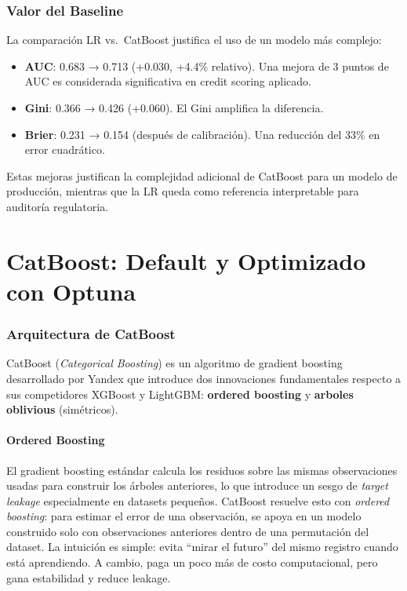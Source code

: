 \documentclass[
  spanish,
  11pt,
  letterpaper,
]{scrbook}
\providecommand{\tightlist}{%
  \setlength{\itemsep}{0pt}\setlength{\parskip}{0pt}}
\theoremstyle{plain}
\theoremstyle{remark}
\begin{document}
\subsection{Valor del Baseline}\label{valor-del-baseline}

La comparación LR vs.~CatBoost justifica el uso de un modelo más
complejo:

\begin{itemize}
\tightlist
\item
  \textbf{AUC}: 0.683 → 0.713 (+0.030, +4.4\% relativo). Una mejora de 3
  puntos de AUC es considerada significativa en credit scoring aplicado.
\item
  \textbf{Gini}: 0.366 → 0.426 (+0.060). El Gini amplifica la
  diferencia.
\item
  \textbf{Brier}: 0.231 → 0.154 (después de calibración). Una reducción
  del 33\% en error cuadrático.
\end{itemize}

Estas mejoras justifican la complejidad adicional de CatBoost para un
modelo de producción, mientras que la LR queda como referencia
interpretable para auditoría regulatoria.

\chapter{CatBoost: Default y Optimizado con
Optuna}\label{sec-catboost-tuned}

\subsection{Arquitectura de CatBoost}\label{arquitectura-de-catboost}

CatBoost (\emph{Categorical Boosting}) es un algoritmo de gradient
boosting desarrollado por Yandex que introduce dos innovaciones
fundamentales respecto a sus competidores XGBoost y LightGBM:
\textbf{ordered boosting} y \textbf{arboles oblivious} (simétricos).

\subsubsection{Ordered Boosting}\label{ordered-boosting}

El gradient boosting estándar calcula los residuos sobre las mismas
observaciones usadas para construir los árboles anteriores, lo que
introduce un sesgo de \emph{target leakage} especialmente en datasets
pequeños. CatBoost resuelve esto con \emph{ordered boosting}: para
estimar el error de una observación, se apoya en un modelo construido
solo con observaciones anteriores dentro de una permutación del dataset.
La intuición es simple: evita ``mirar el futuro'' del mismo registro
cuando está aprendiendo. A cambio, paga un poco más de costo
computacional, pero gana estabilidad y reduce leakage.
\end{document}
